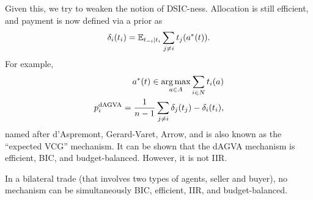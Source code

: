 		Given this, we try to weaken the notion of DSIC-ness. Allocation is still efficient, and payment is now defined via a prior as
		\[ \delta_i(t_i) = \mathbb{E}_{t_{-i} | t_i} \sum_{j \ne i} t_j(a^*(t)). \]
		For example,
		\begin{align*}
			a^*(t) \in \operatorname*{arg\,max}_{a \in A} \sum_{i \in N} t_i(a) \\
			p_i^\text{dAGVA} = \frac{1}{n-1} \sum_{j \ne i} \delta_j(t_j) - \delta_i(t_i),
		\end{align*}
		named after d'Aspremont, Gerard-Varet, Arrow, and is also known as the ``expected VCG'' mechanism. It can be shown that the dAGVA mechanism is efficient, BIC, and budget-balanced. However, it is not IIR.

		\begin{ftheo}
			In a bilateral trade (that involves two types of agents, seller and buyer), no mechanism can be simultaneously BIC, efficient, IIR, and budget-balanced.
		\end{ftheo}